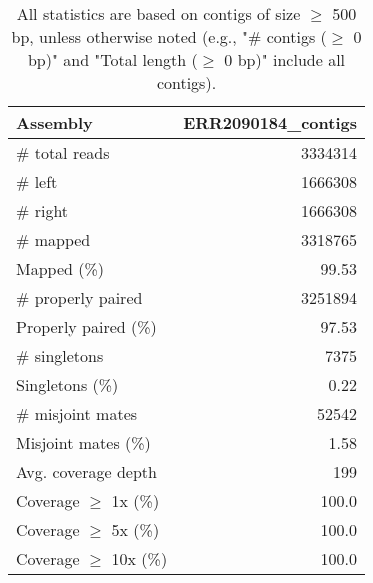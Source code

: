 \documentclass[12pt,a4paper]{article}
\begin{document}
\begin{table}[ht]
\begin{center}
\caption{All statistics are based on contigs of size $\geq$ 500 bp, unless otherwise noted (e.g., "\# contigs ($\geq$ 0 bp)" and "Total length ($\geq$ 0 bp)" include all contigs).}
\begin{tabular}{|l*{1}{|r}|}
\hline
Assembly & ERR2090184\_contigs \\ \hline
\# total reads & 3334314 \\ \hline
\# left & 1666308 \\ \hline
\# right & 1666308 \\ \hline
\# mapped & 3318765 \\ \hline
Mapped (\%) & 99.53 \\ \hline
\# properly paired & 3251894 \\ \hline
Properly paired (\%) & 97.53 \\ \hline
\# singletons & 7375 \\ \hline
Singletons (\%) & 0.22 \\ \hline
\# misjoint mates & 52542 \\ \hline
Misjoint mates (\%) & 1.58 \\ \hline
Avg. coverage depth & 199 \\ \hline
Coverage $\geq$ 1x (\%) & 100.0 \\ \hline
Coverage $\geq$ 5x (\%) & 100.0 \\ \hline
Coverage $\geq$ 10x (\%) & 100.0 \\ \hline
\end{tabular}
\end{center}
\end{table}
\end{document}
